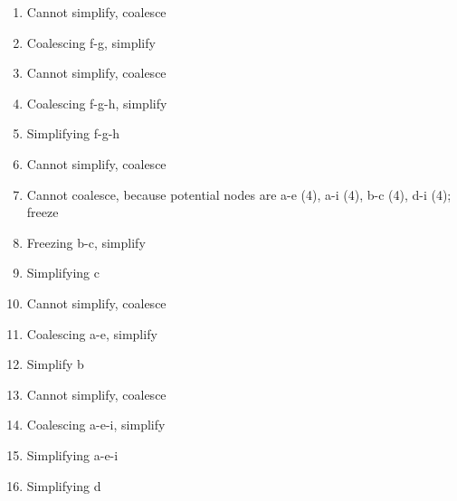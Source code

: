 \documentclass[docid=2019]{comp_exam_round2}
\begin{document}
\begin{multicols}{2}
    \begin{enumerate}[noitemsep]
        \item Cannot simplify, coalesce
        \item Coalescing f-g, simplify
        \item Cannot simplify, coalesce
        \item Coalescing f-g-h, simplify
        \item Simplifying f-g-h
        \item Cannot simplify, coalesce
        \item Cannot coalesce, because potential nodes are a-e (4), a-i (4), b-c (4), d-i (4); freeze
        \item Freezing b-c, simplify
        \item Simplifying c
        \item Cannot simplify, coalesce
        \item Coalescing a-e, simplify
        \item Simplify b
        \item Cannot simplify, coalesce
        \item Coalescing a-e-i, simplify
        \item Simplifying a-e-i
        \item Simplifying d
    \end{enumerate}
\end{multicols}
\end{document}
